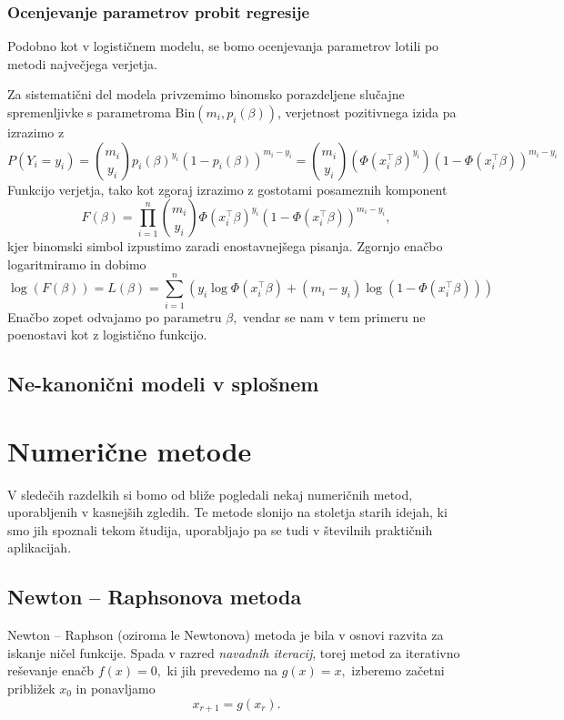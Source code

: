 \documentclass[12pt,a4paper]{amsart}
\theoremstyle{definition} %
\theoremstyle{plain} %
\begin{document}
\subsubsection{Ocenjevanje parametrov probit regresije}
Podobno kot v logističnem modelu, se bomo ocenjevanja parametrov lotili po metodi največjega verjetja. 

Za sistematični del modela privzemimo binomsko porazdeljene slučajne spremenljivke s parametroma $\mathrm{Bin}(m_{i},p_{i}(\beta))$,
verjetnost pozitivnega izida pa izrazimo z
\[
    P(Y_{i} = y_{i}) = \binom{m_{i}}{y_{i}}p_{i}(\beta)^{y_{i}}(1 - p_{i}(\beta))^{m_{i} - y_{i}} = \binom{m_{i}}{y_{i}} (\Phi(x_{i}^\top \beta)^{y_{i}})(1 - \Phi(x_{i}^\top \beta))^{m_{i} - y_{i}} 
\]
Funkcijo verjetja, tako kot zgoraj izrazimo z gostotami posameznih komponent
\[
    F(\beta) = \prod_{i=1}^{n} \binom{m_{i}}{y_{i}} \Phi(x_{i}^\top\beta)^{y_{i}}(1 - \Phi(x_{i}^\top\beta))^{m_{i} - y_{i}},
\]
kjer binomski simbol izpustimo zaradi enostavnejšega pisanja. Zgornjo enačbo logaritmiramo in dobimo
\begin{equation}
    \log(F(\beta)) = L(\beta) = \sum_{i = 1}^{n}\left(y_{i}\log\Phi(x_{i}^\top\beta) + (m_{i} - y_{i})\log(1 - \Phi(x_{i}^\top\beta)) \right)
\end{equation}
Enačbo zopet odvajamo po parametru $\beta,$ vendar se nam v tem primeru ne poenostavi kot z logistično funkcijo.

\subsection{Ne-kanonični modeli v splošnem}

\section{Numerične metode}
V sledečih razdelkih si bomo od bliže pogledali nekaj numeričnih metod, uporabljenih v kasnejših zgledih. Te metode slonijo na stoletja starih
idejah, ki smo jih spoznali tekom študija, uporabljajo pa se tudi v številnih praktičnih aplikacijah.
\subsection{Newton -- Raphsonova metoda} \label{nr}
Newton -- Raphson (oziroma le Newtonova) metoda je bila v osnovi razvita za iskanje ničel funkcije. Spada v razred \textit{navadnih iteracij}, torej metod za iterativno
reševanje enačb $f(x) = 0,$ ki jih prevedemo na $g(x) = x,$ izberemo začetni približek $x_{0}$ in ponavljamo 
\[
    x_{r+1} = g(x_{r}).
\]
\end{document}
